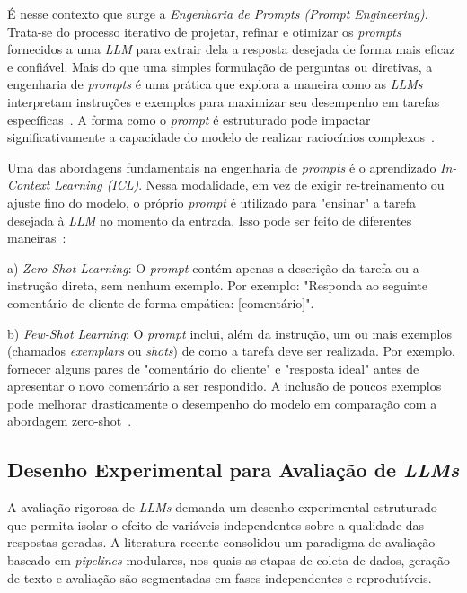 \documentclass[12pt, a4paper]{article}
\numberwithin{equation}{section}
\begin{document}
É nesse contexto que surge a \textit{Engenharia de Prompts (Prompt Engineering)}. Trata-se do processo iterativo de projetar, refinar e otimizar os \textit{prompts} fornecidos a uma \textit{LLM} para extrair dela a resposta desejada de forma mais eficaz e confiável. Mais do que uma simples formulação de perguntas ou diretivas, a engenharia de \textit{prompts} é uma prática que explora a maneira como as \textit{LLMs} interpretam instruções e exemplos para maximizar seu desempenho em tarefas específicas~\cite{wei2022Chain}. A forma como o \textit{prompt} é estruturado pode impactar significativamente a capacidade do modelo de realizar raciocínios complexos~\cite{schulhoff2025Prompt}.

Uma das abordagens fundamentais na engenharia de \textit{prompts} é o aprendizado \textit{In-Context Learning (ICL)}. Nessa modalidade, em vez de exigir re-treinamento ou ajuste fino do modelo, o próprio \textit{prompt} é utilizado para "ensinar" a tarefa desejada à \textit{LLM} no momento da entrada. Isso pode ser feito de diferentes maneiras~\cite{diao2024Active}:

a) \textit{Zero-Shot Learning}: O \textit{prompt} contém apenas a descrição da tarefa ou a instrução direta, sem nenhum exemplo. Por exemplo: "Responda ao seguinte comentário de cliente de forma empática: [comentário]".

b) \textit{Few-Shot Learning}: O \textit{prompt} inclui, além da instrução, um ou mais exemplos (chamados \textit{exemplars} ou \textit{shots}) de como a tarefa deve ser realizada. Por exemplo, fornecer alguns pares de "comentário do cliente" e "resposta ideal" antes de apresentar o novo comentário a ser respondido. A inclusão de poucos exemplos pode melhorar drasticamente o desempenho do modelo em comparação com a abordagem zero-shot~\cite{dang2022How}.

\subsection{Desenho Experimental para Avaliação de \textit{LLMs}}

A avaliação rigorosa de \textit{LLMs} demanda um desenho experimental estruturado que permita isolar o efeito de variáveis independentes sobre a qualidade das respostas geradas. A literatura recente consolidou um paradigma de avaliação baseado em \textit{pipelines} modulares, nos quais as etapas de coleta de dados, geração de texto e avaliação são segmentadas em fases independentes e reprodutíveis.
\end{document}
